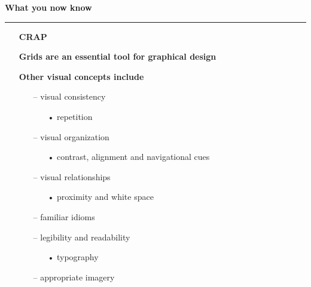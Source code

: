 \documentclass[pdf]{beamer}
\begin{document}
{{{{{{{{{{{{{{{\begin{frame}
    \vspace{25px}
\end{frame}



\begin{frame}
{\textbf{What you now know}}{\textcolor{red}{\rule{12cm}{1.2pt}}}

  	 \begin{itemize}
    	\item[] \textbf{{ CRAP}  }  
        \bigskip
        \item[] \textbf{{ Grids are an essential tool for graphical design} } 
        \bigskip
        \item[] \textbf{{ Other visual concepts include}}  
        \begin{itemize}
        \item[--] { visual consistency }
       		 \begin{itemize}
        	 \item[{•}]{ repetition}
             \end{itemize}
        \medskip
        \item[--] { visual organization }
       		 \begin{itemize}
        	 \item[{•}]{ contrast, alignment and navigational cues}
             \end{itemize}
              \medskip
        \item[--]{  visual relationships }
       		 \begin{itemize}
        	 \item[{•}]{ proximity and white space}
             \end{itemize}
              \medskip
        \item[--] { familiar idioms}
         \medskip
        \item[--] { legibility and readability}
       		 \begin{itemize}
        	 \item[{•}]{ typography}
             \end{itemize}
        \medskip      
        \item[--]{  appropriate imagery}


        \end{itemize}
    \end{itemize}
    \vspace{25px}
\end{frame}}}}}}}}}}}}}}}}
\end{document}
